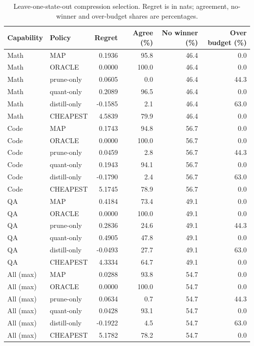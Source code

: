 \begin{table}[H]
\centering
\footnotesize
\caption{Leave-one-state-out compression selection. Regret is in nats; agreement, no-winner and over-budget shares are percentages.}
\label{tab:selection_maps}
\begin{tabular}{llrrrr}
\hline
Capability & Policy & Regret & Agree (\%) & No winner (\%) & Over budget (\%) \\
\hline
Math & MAP & 0.1936 & 95.8 & 46.4 & 0.0 \\
Math & ORACLE & 0.0000 & 100.0 & 46.4 & 0.0 \\
Math & prune-only & 0.0605 & 0.0 & 46.4 & 44.3 \\
Math & quant-only & 0.2089 & 96.5 & 46.4 & 0.0 \\
Math & distill-only & -0.1585 & 2.1 & 46.4 & 63.0 \\
Math & CHEAPEST & 4.5839 & 79.9 & 46.4 & 0.0 \\
\hline
Code & MAP & 0.1743 & 94.8 & 56.7 & 0.0 \\
Code & ORACLE & 0.0000 & 100.0 & 56.7 & 0.0 \\
Code & prune-only & 0.0459 & 2.8 & 56.7 & 44.3 \\
Code & quant-only & 0.1943 & 94.1 & 56.7 & 0.0 \\
Code & distill-only & -0.1790 & 2.4 & 56.7 & 63.0 \\
Code & CHEAPEST & 5.1745 & 78.9 & 56.7 & 0.0 \\
\hline
QA & MAP & 0.4184 & 73.4 & 49.1 & 0.0 \\
QA & ORACLE & 0.0000 & 100.0 & 49.1 & 0.0 \\
QA & prune-only & 0.2836 & 24.6 & 49.1 & 44.3 \\
QA & quant-only & 0.4905 & 47.8 & 49.1 & 0.0 \\
QA & distill-only & -0.0493 & 27.7 & 49.1 & 63.0 \\
QA & CHEAPEST & 4.3334 & 64.7 & 49.1 & 0.0 \\
\hline
All (max) & MAP & 0.0288 & 93.8 & 54.7 & 0.0 \\
All (max) & ORACLE & 0.0000 & 100.0 & 54.7 & 0.0 \\
All (max) & prune-only & 0.0634 & 0.7 & 54.7 & 44.3 \\
All (max) & quant-only & 0.0428 & 93.1 & 54.7 & 0.0 \\
All (max) & distill-only & -0.1922 & 4.5 & 54.7 & 63.0 \\
All (max) & CHEAPEST & 5.1782 & 78.2 & 54.7 & 0.0 \\

\end{tabular}
\end{table}
